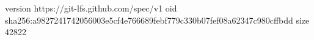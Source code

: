 version https://git-lfs.github.com/spec/v1
oid sha256:a9827241742056003e5cf4e766689febf779c330b07fef08a62347c980cffbdd
size 42822
